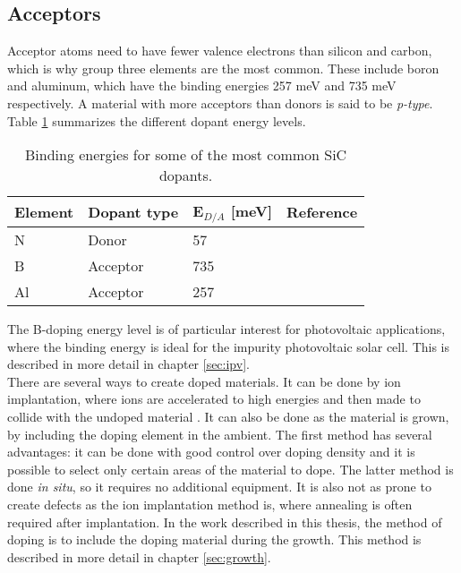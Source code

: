\subsection{Acceptors}
Acceptor atoms need to have fewer valence electrons than silicon and carbon, which is why group three elements are the most common. These include boron and aluminum, which have the binding energies 257 meV \cite{Freitas1988} and 735 meV \cite{Richards2003} respectively. A material with more acceptors than donors is said to be \emph{p-type}. Table \ref{tab:dopants} summarizes the different dopant energy levels. 

\begin{table}[h]
\caption{Binding energies for some of the most common SiC dopants.}
\label{tab:dopants}
\begin{center}
\begin{tabular}{ l l l r}
  \hline                       
  \hline       
  \vspace{1mm}
    Element  & Dopant type & E$_{D/A}$ [meV] & Reference\\
    \hline
  N &  Donor & 57 & \cite{Freitas1988}\\
  B &  Acceptor & 735 & \cite{Richards2003}\\
  Al &  Acceptor & 257  & \cite{Freitas1988}\\
  \hline  
\end{tabular}
\end{center}
\end{table}

The B-doping energy level is of particular interest for photovoltaic applications, where the binding energy is ideal for the impurity photovoltaic solar cell. This is described in more detail in chapter \ref{sec:ipv}. 
\\ 

\noindent 
There are several ways to create doped materials. It can be done by ion implantation, where ions are accelerated to high energies and then made to collide with the undoped material \cite{Rao1999}. It can also be done as the material is grown, by including the doping element in the ambient. The first method has several advantages: it can be done with good control over doping density and it is possible to select only certain areas of the material to dope. The latter method is done \emph{in situ}, so it requires no additional equipment. It is also not as prone to create defects as the ion implantation method is, where annealing is often required after implantation. In the work described in this thesis, the method of doping is to include the doping material during the growth. This method is described in more detail in chapter \ref{sec:growth}. 

